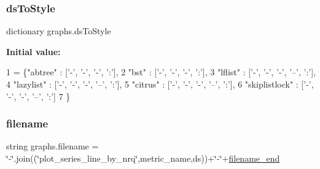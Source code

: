 \subsubsection{\texorpdfstring{ds\+To\+Style}{dsToStyle}}
{\footnotesize\ttfamily dictionary graphs.\+ds\+To\+Style}

{\bfseries Initial value\+:}
\begin{DoxyCode}
1 =  \{\textcolor{stringliteral}{"abtree"} :         [\textcolor{stringliteral}{'-'}, \textcolor{stringliteral}{'-'}, \textcolor{stringliteral}{'-'}, \textcolor{stringliteral}{':'}],
2              \textcolor{stringliteral}{"bst"} :            [\textcolor{stringliteral}{'-'}, \textcolor{stringliteral}{'-'}, \textcolor{stringliteral}{'-'}, \textcolor{stringliteral}{':'}],
3              \textcolor{stringliteral}{"lflist"} :         [\textcolor{stringliteral}{'-'}, \textcolor{stringliteral}{'-'}, \textcolor{stringliteral}{'-'}, \textcolor{stringliteral}{'--'}, \textcolor{stringliteral}{':'}],
4              \textcolor{stringliteral}{"lazylist"} :       [\textcolor{stringliteral}{'-'}, \textcolor{stringliteral}{'-'}, \textcolor{stringliteral}{'-'}, \textcolor{stringliteral}{'--'}, \textcolor{stringliteral}{':'}],
5              \textcolor{stringliteral}{"citrus"} :         [\textcolor{stringliteral}{'-'}, \textcolor{stringliteral}{'-'}, \textcolor{stringliteral}{'-'}, \textcolor{stringliteral}{'--'}, \textcolor{stringliteral}{':'}],
6              \textcolor{stringliteral}{"skiplistlock"} :   [\textcolor{stringliteral}{'-'}, \textcolor{stringliteral}{'-'}, \textcolor{stringliteral}{'-'}, \textcolor{stringliteral}{'--'}, \textcolor{stringliteral}{':'}]
7             \}
\end{DoxyCode}
\mbox{\label{namespacegraphs_add61a1e3eb0503ac58c89959c4ab20be}} 
\subsubsection{\texorpdfstring{filename}{filename}}
{\footnotesize\ttfamily string graphs.\+filename = \char`\"{}-\/\char`\"{}.join((\char`\"{}plot\+\_\+series\+\_\+line\+\_\+by\+\_\+nrq\char`\"{},metric\+\_\+name,ds))+\char`\"{}-\/\char`\"{}+\hyperlink{namespacegraphs_aa9dc708029dd1052d8aa26ecfdb9c898}{filename\+\_\+end}}

\mbox{\label{namespacegraphs_aa9dc708029dd1052d8aa26ecfdb9c898}} 
